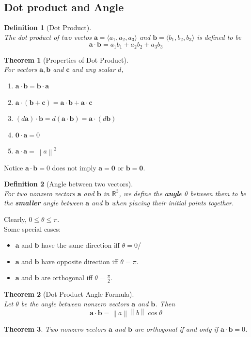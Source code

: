 \documentclass[12pt]{article}
\newcommand\norm[1]{\left\lVert#1\right\rVert}
\newtheorem{definition}{Definition}[section]
\newtheorem{theorem}{Theorem}[section]
\theoremstyle{definition}
\newcommand\ve[1]{\mathbf{#1}}
\begin{document}
\subsection{Dot product and Angle}
\begin{definition}[Dot Product]
\hfill\\\normalfont The dot product of two vectos $\ve{a}=\langle a_1,a_2,a_3\rangle$ and $\ve{b}=\langle b_1,b_2,b_3\rangle$ is defined to be
\[
\ve{a}\cdot\ve{b}=a_1b_1+a_2b_2+a_3b_3
\]
\end{definition}
\begin{theorem}[Properties of Dot Product]
\hfill\\\normalfont For vectors $\ve{a}, \ve{b}$ and $\ve{c}$ and any scalar $d$,
\begin{enumerate}
  \item $\ve{a}\cdot\ve{b} = \ve{b}\cdot\ve{a}$
  \item $\ve{a}\cdot(\ve{b}+\ve{c})=\ve{a}\cdot\ve{b}+\ve{a}\cdot\ve{c}$
  \item $(d\ve{a})\cdot \ve{b} = d(\ve{a}\cdot\ve{b}) = \ve{a}\cdot(d\ve{b})$
  \item $\ve{0}\cdot\ve{a}=0$
  \item $\ve{a}\cdot\ve{a}=\norm{a}^2$
\end{enumerate}
\end{theorem}
Notice $\ve{a}\cdot\ve{b}= 0$ does not imply $\ve{a}=\ve{0}$ or $\ve{b}=\ve{0}$.
\begin{definition}[Angle between two vectors]
\hfill\\\normalfont For two nonzero vectors $\ve{a}$ and $\ve{b}$ in $\mathbb{R}^3$, we define the \textbf{angle} $\theta$ between them to be the \textbf{smaller} angle between $\ve{a}$ and $\ve{b}$ when placing their initial points together.
\end{definition}
Clearly, $0\leq \theta\leq \pi$.\\
Some special cases:
\begin{itemize}
\item $\ve{a}$ and $\ve{b}$ have the same direction iff $\theta = 0$/
\item $\ve{a}$ and $\ve{b}$ have opposite direction iff $\theta = \pi$.
\item $\ve{a}$ and $\ve{b}$ are orthogonal iff $\theta = \frac{\pi}{2}$.
\end{itemize}
\begin{theorem}[Dot Product Angle Formula]
\hfill\\\normalfont Let $\theta$ be the angle between nonzero vectors $\ve{a}$ and $\ve{b}$. Then
\[
\ve{a}\cdot\ve{b}=\norm{a}\norm{b}\cos\theta
\]
\end{theorem}
\begin{theorem}\normalfont Two nonzero vectors $\ve{a}$ and $\ve{b}$ are orthogonal if and only if $\ve{a}\cdot\ve{b} = 0$.
\end{theorem}
\end{document}
